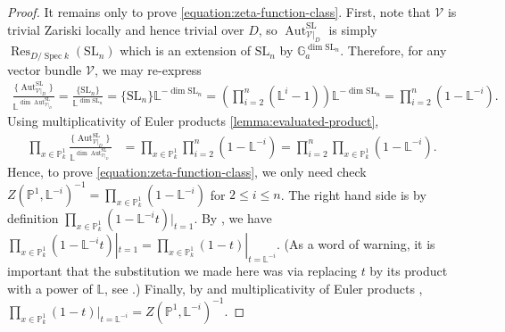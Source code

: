 \documentclass[12 pt]{amsart}
\theoremstyle{plain}
\theoremstyle{definition}
\newtheorem{remark}[theorem]{Remark}
\theoremstyle{remark}
\numberwithin{equation}{section}
\newcommand\bg{\mathbb G}
\newcommand\bl{\mathbb L}
\newcommand\bp{\mathbb P}
\newcommand\scv{\mathscr V}
\DeclareMathOperator\spec{\operatorname{Spec}}
\DeclareMathOperator\res{Res}
\DeclareMathOperator\aut{Aut}
\renewcommand\sl{\mathrm{SL}}
\begin{document}
\begin{proof}
It remains only to prove \eqref{equation:zeta-function-class}.  First, note that
$\scv$ is trivial Zariski locally and hence trivial over $D$, so
$\aut^{\sl}_{\scv|_D}$ is simply $\res_{D/\spec k}(\sl_n)$ which is an extension
of $\sl_n$ by $\bg_a^{\dim \sl_n}$.  Therefore, for any vector bundle $\scv$, we
may re-express \begin{align*} \frac{\{\aut^{\sl}_{\scv|_D}\}}{\bl^{\dim
	\aut^{\sl}_{\scv|_D}}} = \frac{\{\sl_n\}}{\bl^{\dim \sl_n}} = \{\sl_n\}
	\bl^{-\dim \sl_n} = \left(\prod_{i=2}^n (\bl^i - 1 ) \right)  \bl^{-\dim
	\sl_n} = \prod_{i=2}^n (1-\bl^{-i}).  \end{align*} 
	Using
	multiplicativity of Euler products \autoref{lemma:evaluated-product},
	\begin{align*} \prod_{x \in
		\bp^1_k}\frac{\{\aut^{\sl}_{\scv|_D}\}}{\bl^{\dim
		\aut^{\sl}_{\scv|_D}}} &= \prod_{x \in \bp^1_k} \prod_{i=2}^n
		(1-\bl^{-i}) = \prod_{i=2}^n \prod_{x \in \bp^1_k}
	(1-\bl^{-i}).  \end{align*} Hence, to prove
	\eqref{equation:zeta-function-class}, we only need check $Z(\bp^1,
	\bl^{-i})^{-1} = \prod_{x \in \bp^1_k} (1-\bl^{-i})$ for $2 \leq i \leq n$.  The right hand side is
	by definition $\prod_{x \in \bp^1_k} (1-\bl^{-i}t)|_{t = 1}$.  By
	\cite[\S3.8, Property 4]{bilu:thesis}, we have $\prod_{x \in \bp^1_k}
	(1-\bl^{-i}t)|_{t = 1} = \prod_{x \in \bp^1_k} (1-t)|_{t = \bl^{-i}}$.
	(As a word of warning, it is important that the substitution we made here
		was via replacing $t$ by its product with a power of $\bl$, see
	\cite[Rem.\ 6.5.2 and
6.5.3]{biluH:motivic-euler-products-in-motivic-statistics}.) Finally, by
\cite[Ex.\ 6.1.12]{biluH:motivic-euler-products-in-motivic-statistics} and
multiplicativity of Euler products \cite[Prop.\ 3.9.2.4]{bilu:thesis}, $\prod_{x
\in \bp^1_k} (1-t)|_{t = \bl^{-i}} = Z(\bp^1, \bl^{-i})^{-1}$.  \end{proof}

\end{document}
